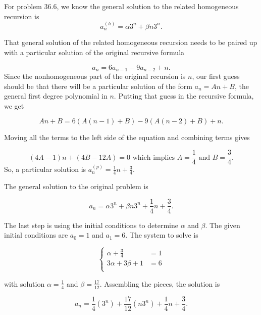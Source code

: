 \begin{Solution}{37.4}

For problem 36.6, we know the general solution to the related homogeneous recursion is
\[
a_n^{(h)} = \alpha3^n +\beta n 3^n.
\]

That general solution  of the related homogeneous recursion needs to be paired up with a particular solution of the original 
recursive formula

\[
a_n = 6a_{n-1}  -9a_{n-2}+n.
\]
Since the nonhomogeneous part of the original recursion is  $n$, our first guess should be that there
will be a particular solution of the form $a_n = An+B$, the general first degree polynomial in $n$. 
Putting that guess in the recursive formula, we get

\[
An+B = 6(A(n-1)+B) - 9(A(n-2)+B) + n.
\]

Moving all the terms to the left side of the equation  and combining terms gives

\[
(4A-1)n +(4B-12A) = 0 \text{ which implies  } A= \frac{1}{4} \text{ and } B = \frac{3}{4}.
\]
 So, a particular solution is $a_{n}^{(p)} =\frac{1}{4}n + \frac{3}{4}$.
 
 The general solution to the original problem is
 
 \[
 a_{n} = \alpha3^n +\beta n 3^n +\frac{1}{4}n + \frac{3}{4}.
 \]
 
 The last step is using the initial conditions to determine $\alpha$ and $\beta$. The given initial conditions are $a_0 = 1$ and $a_1 = 6$. The system to solve is

\[
  \left\{
    \begin{aligned}
     \alpha   + \frac{3}{4} &= 1\\
     3\alpha + 3\beta +1 &= 6\\
     \end{aligned}
   \right.
\]

with solution $\alpha = \frac{1}{4}$ and $\beta = \frac{17}{12}$.  Assembling the pieces,  the solution is

\[
a_n = \frac{1}{4}(3^n) + \frac{17}{12} (n 3^n)+ \frac{1}{4}n + \frac{3}{4} .
\]


\end{Solution}

